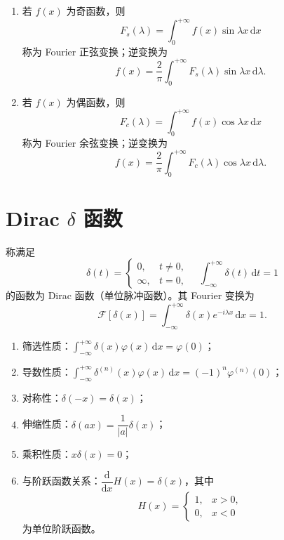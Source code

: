 \begin{definition}[正弦与余弦变换]
  \begin{enumerate}
    \item 若 $f(x)$ 为奇函数，则
    \[
    F_s(\lambda)=\int_{0}^{+\infty}f(x)\sin\lambda x\,\mathrm{d}x
    \]
    称为 Fourier 正弦变换；逆变换为
    \[
    f(x)=\frac{2}{\pi}\int_{0}^{+\infty}F_s(\lambda)\sin\lambda x\,\mathrm{d}\lambda.
    \]
    \item 若 $f(x)$ 为偶函数，则
    \[
    F_c(\lambda)=\int_{0}^{+\infty}f(x)\cos\lambda x\,\mathrm{d}x
    \]
    称为 Fourier 余弦变换；逆变换为
    \[
    f(x)=\frac{2}{\pi}\int_{0}^{+\infty}F_c(\lambda)\cos\lambda x\,\mathrm{d}\lambda.
    \]
  \end{enumerate}
\end{definition}

\section{Dirac $\delta$ 函数}

\begin{definition}
  称满足
  \[
  \delta(t)=
  \begin{cases}
    0, & t\neq 0,\\
    \infty, & t=0,
  \end{cases}
  \quad
  \int_{-\infty}^{+\infty}\delta(t)\,\mathrm{d}t=1
  \]
  的函数为 Dirac 函数（单位脉冲函数）。其 Fourier 变换为
  \[
  \mathcal{F}[\delta(x)]=\int_{-\infty}^{+\infty}\delta(x)e^{-i\lambda x}\,\mathrm{d}x=1.
  \]
\end{definition}

\begin{theorem}
  \begin{enumerate}
    \item 筛选性质：$\displaystyle\int_{-\infty}^{+\infty}\delta(x)\varphi(x)\,\mathrm{d}x=\varphi(0)$；
    \item 导数性质：$\displaystyle\int_{-\infty}^{+\infty}\delta^{(n)}(x)\varphi(x)\,\mathrm{d}x=(-1)^n\varphi^{(n)}(0)$；
    \item 对称性：$\delta(-x)=\delta(x)$；
    \item 伸缩性质：$\delta(ax)=\dfrac{1}{|a|}\delta(x)$；
    \item 乘积性质：$x\delta(x)=0$；
    \item 与阶跃函数关系：$\dfrac{\mathrm{d}}{\mathrm{d}x}H(x)=\delta(x)$，其中
    \[
    H(x)=
    \begin{cases}
      1, & x>0,\\
      0, & x<0
    \end{cases}
    \]
    为单位阶跃函数。
  \end{enumerate}
\end{theorem}

